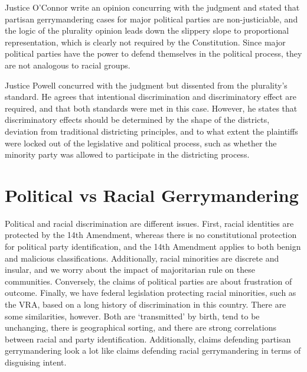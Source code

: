 Justice O'Connor write an opinion concurring with the judgment and stated that partisan gerrymandering cases for major political parties are non-justiciable, and the logic of the plurality opinion leads down the slippery slope to proportional representation, which is clearly not required by the Constitution.  Since major political parties have the power to defend themselves in the political process, they are not analogous to racial groups.

Justice Powell concurred with the judgment but dissented from the plurality's standard.  He agrees that intentional discrimination and discriminatory effect are required, and that both standards were met in this case.  However, he states that discriminatory effects should be determined by the shape of the districts, deviation from traditional districting principles, and to what extent the plaintiffs were locked out of the legislative and political process, such as whether the minority party was allowed to participate in the districting process.

\section*{Political vs Racial Gerrymandering}

Political and racial discrimination are different issues.  First, racial identities are protected by the 14th Amendment, whereas there is no constitutional protection for political party identification, and the 14th Amendment applies to both benign and malicious classifications.  Additionally, racial minorities are discrete and insular, and we worry about the impact of majoritarian rule on these communities.  Conversely, the claims of political parties are about frustration of outcome.  Finally, we have federal legislation protecting racial minorities, such as the VRA, based on a long history of discrimination in this country.  There are some similarities, however.  Both are `transmitted' by birth, tend to be unchanging, there is geographical sorting, and there are strong correlations between racial and party identification.  Additionally, claims defending partisan gerrymandering look a lot like claims defending racial gerrymandering in terms of disguising intent.


